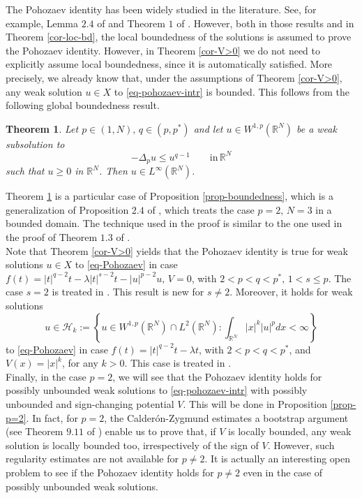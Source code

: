 \documentclass[11pt,reqno]{amsart}
\newtheorem{theorem}{Theorem}
\theoremstyle{definition}
\numberwithin{equation}{section}
\numberwithin{theorem}{section}
\numberwithin{equation}{section}
\numberwithin{theorem}{section}
\newcommand{\R}{\mathbb{R}}
\begin{document}
The Pohozaev identity has been widely studied in the literature. See, for example, Lemma $2.4$ of \cite{zhang2022normalized} and Theorem $1$ of \cite{degiovanni2003regularity}. However, both in those results and in Theorem \ref{cor-loc-bd}, the local boundedness of the solutions is assumed to prove the Pohozaev identity. However, in Theorem \ref{cor-V>0} we do not need to explicitly assume local boundedness, since it is automatically satisfied. More precisely, we already know that, under the assumptions of Theorem \ref{cor-V>0}, any weak solution $u\in X$ to \eqref{eq-pohozaev-intr} is bounded. This follows from the following global boundedness result.
\begin{theorem}\label{th-boundedness}
Let $p\in(1,N),\,q\in(p,p^*)$ and let $u\in W^{1,p}(\R^N)$ be a weak subsolution to
$$-\Delta_p u\le u^{q-1}\qquad\text{in}\,\R^N$$
such that $u\ge 0$ in $\R^N$. Then $u\in L^\infty(\R^N)$.
\end{theorem}
Theorem \ref{th-boundedness} is a particular case of Proposition \ref{prop-boundedness}, which is a generalization of Proposition $2.4$ of \cite{PR}, which treats the case $p=2,\,N=3$ in a bounded domain. The technique used in the proof is similar to the one used in the proof of Theorem $1.3$ of \cite{pucci2024bifurcation}.\\

Note that Theorem \ref{cor-V>0} yields that the Pohozaev identity is true for weak solutions $u\in X$ to \eqref{eq-Pohozaev} in case $f(t)=|t|^{q-2}t-\lambda |t|^{s-2}t-|u|^{p-2}u,\, V=0$, with $2<p<q<p^*,\,1<s\le p$. The case $s=2$ is treated in \cite{wang2021normalized,guedda1989quasilinear}. This result is new for $s\ne 2$. Moreover, it holds for weak solutions $$u\in\mathcal{H}_k:=\left\{u\in W^{1,p}(\R^N)\cap L^2(\R^N):\int_{\R^N}|x|^k|u|^pdx<\infty\right\}$$
to \eqref{eq-Pohozaev} in case $f(t)=|t|^{q-2}t-\lambda t$, with $2<p<q<p^*$, and $V(x)=|x|^k$, for any $k>0$. This case is treated in \cite{wang2023normalized}.\\

Finally, in the case $p=2$, we will see that the Pohozaev identity holds for possibly unbounded weak solutions to \eqref{eq-pohozaev-intr} with possibly unbounded and sign-changing potential $V$. This will be done in Proposition \ref{prop-p=2}. In fact, for $p=2$, the Calder\'{o}n-Zygmund estimates a bootstrap argument (see Theorem $9.11$ of \cite{gilbarg1977elliptic}) enable us to prove that, if $V$ is locally bounded, any weak solution is locally bounded too, irrespectively of the sign of $V$. However, such regularity estimates are not available for $p\ne 2$. It is actually an interesting open problem to see if the Pohozaev identity holds for $p\ne 2$ even in the case of possibly unbounded weak solutions.\\
\end{document}
